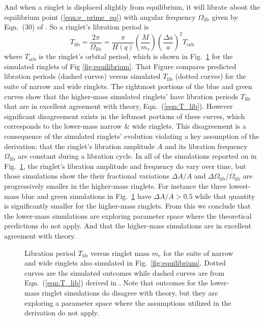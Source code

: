 \documentclass[preprint]{aastex62}
\begin{document}
And when a ringlet is displaced slightly from equilibrium, it will
librate about the equilibrium point (\ref{eqn:e_prime_eq}) 
with angular frequency $\Omega_\text{lib}$ given by Eqn.\ (30) of \cite{BGT83AJpaper}.
So a ringlet's libration period is
\begin{equation}
    \label{eqn:T_lib}
    T_\text{lib} = \frac{2\pi}{\Omega_\text{lib}} = 
        \frac{\pi}{H(q)}\left(\frac{M}{m_r}\right)\left(\frac{\Delta a}{a}\right)^2 T_\text{orb}
\end{equation}
where $T_\text{orb}$ is the ringlet's orbital period, which is shown in Fig.\ \ref{fig:libration} for the 
simulated ringlets of Fig \ref{fig:equilibrium}. 
That Figure compares predicted libration periods (dashed curves) versus simulated $T_\text{lib}$
(dotted curves) for the suite of narrow and wide ringlets. The rightmost portions of the blue and green curves show that the
higher-mass simulated ringlets' have libration periods $T_\text{lib}$ that are in excellent agreement with theory, 
Eqn.\ (\ref{eqn:T_lib}). However significant disagreement exists in the leftmost portions
of these curves, which corresponds to the lower-mass narrow \& wide ringlets. 
This disagreement is a consequence of the simulated ringlets' evolution
violating a key assumption of the \cite{BGT83AJpaper} derivation: 
that the ringlet's libration amplitude $A$ and its libration frequency $\Omega_\text{lib}$ are constant during a libration
cycle. In all of the simulations reported on in Fig.\ \ref{fig:libration}, the ringlet's libration amplitude and
frequency do vary over time, but those simulations show the their fractional variations $\Delta A/A$ and 
$\Delta\Omega_\text{lib}/\Omega_\text{lib}$ 
are progressively smaller in the higher-mass ringlets. For instance the three lowest-mass blue and green
simulations in Fig.\ \ref{fig:libration} have $\Delta A/A>0.5$ while that quantity is significantly smaller
for the higher-mass ringlets. From this we conclude that the lower-mass simulations 
are exploring parameter space where the theoretical predictions do not apply. And that the higher-mass simulations 
are in excellent agreement with theory.

\begin{figure}
    \caption{
        \label{fig:libration}
        Libration period $T_\text{lib}$ versus ringlet mass $m_r$ for the suite of narrow and wide ringlets
        also simulated in Fig.\ \ref{fig:equilibrium}. Dotted curves are the simulated outcomes while dashed
        curves are from Eqn.\ (\ref{eqn:T_lib}) derived in \citep{BGT83AJpaper}. Note that outcomes for the lower-mass ringlet
        simulations do disagree with theory, but they are exploring a parameter space where the 
        assumptions utilized in the derivation do not apply. 
    }
\end{figure}
\end{document}
